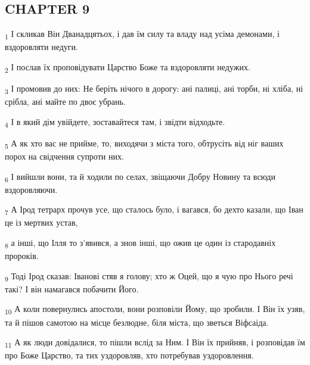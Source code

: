 \subsection{CHAPTER 9}
\begin{tcolorbox}
\textsubscript{1} І скликав Він Дванадцятьох, і дав їм силу та владу над усіма демонами, і вздоровляти недуги.
\end{tcolorbox}
\begin{tcolorbox}
\textsubscript{2} І послав їх проповідувати Царство Боже та вздоровляти недужих.
\end{tcolorbox}
\begin{tcolorbox}
\textsubscript{3} І промовив до них: Не беріть нічого в дорогу: ані палиці, ані торби, ні хліба, ні срібла, ані майте по двоє убрань.
\end{tcolorbox}
\begin{tcolorbox}
\textsubscript{4} І в який дім увійдете, зоставайтеся там, і звідти відходьте.
\end{tcolorbox}
\begin{tcolorbox}
\textsubscript{5} А як хто вас не прийме, то, виходячи з міста того, обтрусіть від ніг ваших порох на свідчення супроти них.
\end{tcolorbox}
\begin{tcolorbox}
\textsubscript{6} І вийшли вони, та й ходили по селах, звіщаючи Добру Новину та всюди вздоровляючи.
\end{tcolorbox}
\begin{tcolorbox}
\textsubscript{7} А Ірод тетрарх прочув усе, що сталось було, і вагався, бо дехто казали, що Іван це із мертвих устав,
\end{tcolorbox}
\begin{tcolorbox}
\textsubscript{8} а інші, що Ілля то з'явився, а знов інші, що ожив це один із стародавніх пророків.
\end{tcolorbox}
\begin{tcolorbox}
\textsubscript{9} Тоді Ірод сказав: Іванові стяв я голову; хто ж Оцей, що я чую про Нього речі такі? І він намагався побачити Його.
\end{tcolorbox}
\begin{tcolorbox}
\textsubscript{10} А коли повернулись апостоли, вони розповіли Йому, що зробили. І Він їх узяв, та й пішов самотою на місце безлюдне, біля міста, що зветься Віфсаіда.
\end{tcolorbox}
\begin{tcolorbox}
\textsubscript{11} А як люди довідалися, то пішли вслід за Ним. І Він їх прийняв, і розповідав їм про Боже Царство, та тих уздоровляв, хто потребував уздоровлення.
\end{tcolorbox}
